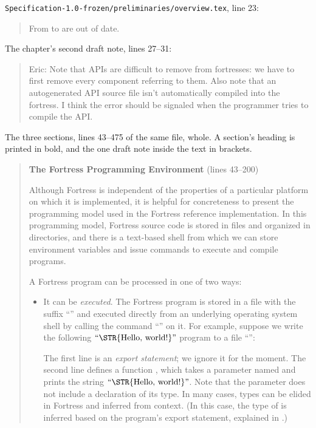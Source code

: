 \begin{description}
\nolinkurl{Specification-1.0-frozen/preliminaries/overview.tex}, line 23:
\begin{quote}
From  to  are out of date.
\end{quote}
The chapter's second draft note, lines 27--31:
\begin{quote}
Eric: Note that APIs are difficult to remove from fortresses: we have
to first remove every component referring to them. Also note
that an autogenerated API source file isn't automatically compiled
into the fortress. I think the error should be signaled when the
programmer tries to compile the API.
\end{quote}
The three sections, lines 43--475 of the same file, whole.
A section's heading is printed in bold, and the one draft note inside the
text in brackets.
\begin{quote}
\textbf{The Fortress Programming Environment} (lines 43--200)

Although Fortress is independent of the properties of a particular
platform on which it is implemented, it is helpful for concreteness
to present the programming model used in the Fortress reference implementation.
In this programming model,
Fortress source code is stored in files and organized in
directories, and there is a text-based shell from which we can store
environment variables and issue commands to execute and compile
programs.

A Fortress program can be processed in one of two ways:

\begin{itemize}

\item It can be \emph{executed}. The Fortress program is stored in a file with
the suffix ``'' and executed directly from an underlying
operating
system shell by calling the command ``'' on it.
For example,
suppose we write the following \(\hbox{\rm``\STR{Hello,~world!}''}\) program
to a file ``'':


The first line is an \emph{export statement};
we ignore it for the moment.
The second line defines a function ,
which takes a parameter named 
and prints the string \(\hbox{\rm``\STR{Hello,~world!}''}\).
Note that the parameter 
does not include a declaration of its type.
In many cases,
 types can be elided in Fortress and inferred from context.
(In this case,
the type of  is inferred based on the program's export statement,
explained in .)


\end{itemize}
\end{quote}
\end{description}
